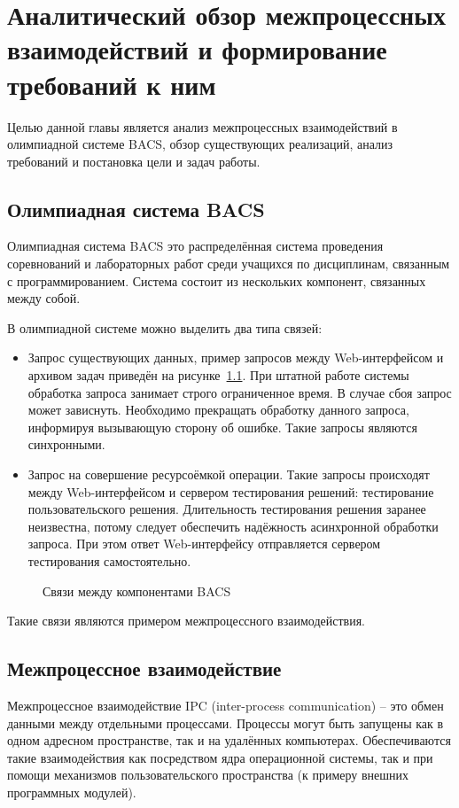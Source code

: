 \chapter{Аналитический обзор межпроцессных взаимодействий
и формирование требований к ним}

Целью данной главы является анализ межпроцессных взаимодействий
в олимпиадной системе BACS, обзор существующих реализаций,
анализ требований и постановка цели и задач работы.

\section{Олимпиадная система BACS}
Олимпиадная система BACS это распределённая система проведения соревнований
и лабораторных работ среди учащихся по дисциплинам, связанным
с программированием. Система состоит из нескольких компонент,
связанных между собой.

В олимпиадной системе можно выделить два типа связей:
\begin{itemize}
    \item Запрос существующих данных, пример запросов между Web-интерфейсом и
        архивом задач приведён на рисунке~\ref{fig:bacsbasicrpc}.
        При штатной работе системы обработка запроса занимает строго
        ограниченное время. В случае сбоя запрос может зависнуть.
        Необходимо прекращать обработку данного запроса,
        информируя вызывающую сторону об ошибке. Такие запросы являются
        синхронными.
    \item Запрос на совершение ресурсоёмкой операции. Такие запросы происходят
        между Web-интерфейсом и сервером тестирования решений: тестирование
        пользовательского решения.
        Длительность тестирования решения заранее неизвестна, потому следует
        обеспечить надёжность асинхронной обработки запроса. При этом ответ
        Web-интерфейсу отправляется сервером тестирования самостоятельно.
\end{itemize}

\begin{figure}[H]
    \centering
    
    \caption{Связи между компонентами BACS}
    \label{fig:bacsbasicrpc}
\end{figure}

Такие связи являются примером межпроцессного взаимодействия.

\section{Межпроцессное взаимодействие}
Межпроцессное взаимодействие IPC (inter-process communication) --
это обмен данными между отдельными процессами.
Процессы могут быть запущены как в одном адресном пространстве,
так и на удалённых компьютерах. Обеспечиваются такие взаимодействия
как посредством ядра операционной системы, так и при помощи механизмов
пользовательского пространства (к примеру внешних программных модулей).

